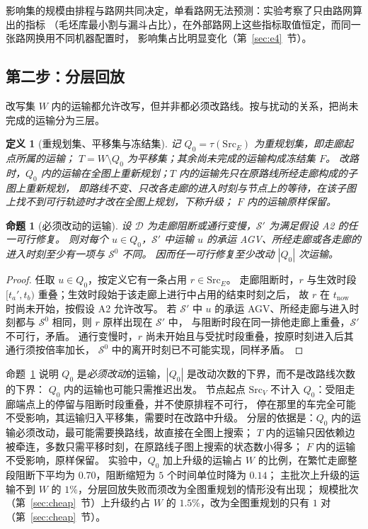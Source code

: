 \documentclass[manuscript,screen,review]{acmart}
\newcommand{\TierReplanShare}{0.70}      %
\newtheorem{definition}{定义}
\newtheorem{prop}{命题}
\begin{document}
影响集的规模由排程与路网共同决定，单看路网无法预测：实验考察了只由路网算出的指标
（毛坯库最小割与漏斗占比），在外部路网上这些指标取值恒定，而同一张路网换用不同机器配置时，
影响集占比明显变化（第~\ref{sec:e4}~节）。

\subsection{第二步：分层回放}
\label{sec:level1}

改写集 \(W\) 内的运输都允许改写，但并非都必须改路线。按与扰动的关系，把尚未完成的运输分为三层。

\begin{definition}[重规划集、平移集与冻结集]
\label{def:tiers}
记 \(Q_0=\tau(\mathrm{Src}_E)\) 为\emph{重规划集}，即走廊起点所属的运输；
\(T=W\setminus Q_0\) 为\emph{平移集}；其余尚未完成的运输构成\emph{冻结集} \(F\)。
改路时，\(Q_0\) 内的运输在全图上重新规划；\(T\) 内的运输先只在原路线所经走廊构成的子图上重新规划，
即路线不变、只改各走廊的进入时刻与节点上的等待，在该子图上找不到可行轨迹时才改在全图上规划，下称\emph{升级}；
\(F\) 内的运输原样保留。
\end{definition}

\begin{prop}[必须改动的运输]
\label{prop:must}
设 \(\mathcal{D}\) 为走廊阻断或通行变慢，\(\mathcal{S}'\) 为满足假设 A2 的任一可行修复。
则对每个 \(u\in Q_0\)，\(\mathcal{S}'\) 中运输 \(u\) 的承运 AGV、所经走廊或各走廊的进入时刻至少有一项与 \(\mathcal{S}^0\) 不同。
因而任一可行修复至少改动 \(|Q_0|\) 次运输。
\end{prop}

\begin{proof}
任取 \(u\in Q_0\)，按定义它有一条占用 \(r\in\mathrm{Src}_E\)。
走廊阻断时，\(r\) 与生效时段 \([t_a',t_b)\) 重叠；生效时段始于该走廊上进行中占用的结束时刻之后，
故 \(r\) 在 \(t_{\mathrm{now}}\) 时尚未开始，按假设 A2 允许改写。
若 \(\mathcal{S}'\) 中 \(u\) 的承运 AGV、所经走廊与进入时刻都与 \(\mathcal{S}^0\) 相同，则 \(r\) 原样出现在 \(\mathcal{S}'\) 中，
与阻断时段在同一排他走廊上重叠，\(\mathcal{S}'\) 不可行，矛盾。
通行变慢时，\(r\) 尚未开始且与受扰时段重叠，按原时刻进入后其通行须按倍率加长，
\(\mathcal{S}^0\) 中的离开时刻已不可能实现，同样矛盾。
\end{proof}

命题~\ref{prop:must} 说明 \(Q_0\) 是\emph{必须改动}的运输，\(|Q_0|\) 是改动次数的下界，而不是改路线次数的下界：
\(Q_0\) 内的运输也可能只需推迟出发。
节点起点 \(\mathrm{Src}_V\) 不计入 \(Q_0\)：受阻走廊端点上的停留与阻断时段重叠，并不使原排程不可行，
停在那里的车完全可能不受影响，其运输归入平移集，需要时在改路中升级。
分层的依据是：\(Q_0\) 内的运输必须改动，最可能需要换路线，故直接在全图上搜索；
\(T\) 内的运输只因依赖边被牵连，多数只需平移时刻，在原路线子图上搜索的状态数小得多；
\(F\) 内的运输不受影响，原样保留。
实验中，\(Q_0\) 加上升级的运输占 \(W\) 的比例，在繁忙走廊整段阻断下平均为 \TierReplanShare，阻断缩短为 \(5\) 个时间单位时降为 \(0.14\)；
主批次上升级的运输不到 \(W\) 的 \(1\%\)，分层回放失败而须改为全图重规划的情形没有出现；
规模批次（第~\ref{sec:cheap}~节）上升级约占 \(W\) 的 \(1.5\%\)，改为全图重规划的只有 \(1\) 对（第~\ref{sec:cheap}~节）。
\end{document}
